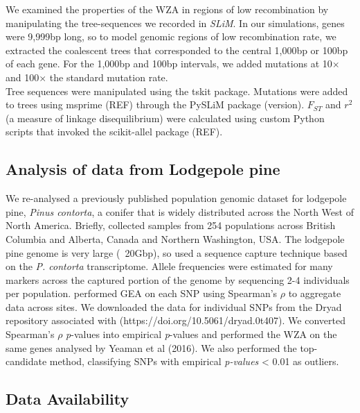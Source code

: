 \documentclass[10pt,twoside,lineno, twocolumn]{GSA_format}
\begin{document}
We examined the properties of the WZA in regions of low recombination by manipulating the tree-sequences we recorded in \textit{SLiM}. In our simulations, genes were 9,999bp long, so to model genomic regions of low recombination rate, we extracted the coalescent trees that corresponded to the central 1,000bp or 100bp of each gene. For the 1,000bp and 100bp intervals, we added mutations at 10$\times$ and 100$\times$ the standard mutation rate. \\

Tree sequences were manipulated using the tskit package. Mutations were added to trees using msprime (REF) through the PySLiM package (version). $F_{ST}$ and $r^2$ (a measure of linkage disequilibrium) were calculated using custom Python scripts that invoked the scikit-allel package (REF).\\



\subsection{Analysis of data from Lodgepole pine}

We re-analysed a previously published population genomic dataset for lodgepole pine, \textit{Pinus contorta}, a conifer that is widely distributed across the North West of North America. Briefly, \cite{Yeaman2016} collected samples from 254 populations across British Columbia and Alberta, Canada and Northern Washington, USA. The lodgepole pine genome is very large (~20Gbp), so \cite{Yeaman2016} used a sequence capture technique based on the \textit{P. contorta} transcriptome. Allele frequencies were estimated for many markers across the captured portion of the genome by sequencing 2-4 individuals per population. \cite{Yeaman2016} performed GEA on each SNP using Spearman's $\rho$ to aggregate data across sites. We downloaded the data for individual SNPs from the Dryad repository associated with \cite{Yeaman2016} (https://doi.org/10.5061/dryad.0t407). We converted Spearman's $\rho$ \textit{p}-values into empirical \textit{p}-values and performed the WZA on the same genes analysed by Yeaman et al (2016). We also performed the top-candidate method, classifying SNPs with empirical \textit{p-values} < 0.01 as outliers. 

\subsection{Data Availability}
\end{document}
